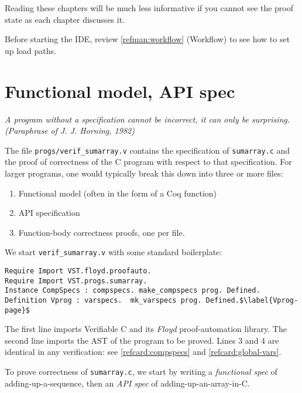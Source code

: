 \documentclass[12pt,fleqn,openany,oneside,showtrims]{memoir}
\begin{document}
Reading these chapters will be much less
informative if you cannot see the
proof state as each chapter discusses it.

Before starting the IDE, review \autoref{refman:workflow} (Workflow)
to see how to set up load paths.

\chapter{Functional model, API spec}
\label{start-ide}\label{refcard:api-spec}

\emph{A program without a specification cannot be \emph{incorrect},
it can only be \emph{surprising}.  \hfill (Paraphrase of J. J. Horning, 1982)}

The file \lstinline{progs/verif_sumarray.v} contains
the specification of \lstinline{sumarray.c}
and the proof of correctness of the C program with respect
to that specification.  For larger programs, one would
typically break this down into three or more files:
\begin{enumerate}
\item Functional model (often in the form of a Coq function)
\item API specification
\item Function-body correctness proofs, one per file.
\end{enumerate}

We start \lstinline{verif_sumarray.v}
with some standard boilerplate:\label{refcard:boilerplate}
\begin{lstlisting}
Require Import VST.floyd.proofauto.
Require Import VST.progs.sumarray.
Instance CompSpecs : compspecs. make_compspecs prog. Defined.
Definition Vprog : varspecs.  mk_varspecs prog. Defined.$\label{Vprog-page}$
\end{lstlisting}
The first line imports Verifiable C and its \emph{Floyd} proof-automation library.  The second line imports the AST of the program to be proved.  Lines 3 and 4 are identical in any verification:
see \autoref{refcard:compspecs} and \autoref{refcard:global-vars}.

To prove correctness of \lstinline{sumarray.c},
we start by writing a \emph{functional spec} of adding-up-a-sequence,
then an \emph{API spec} of adding-up-an-array-in-C.
\end{document}
